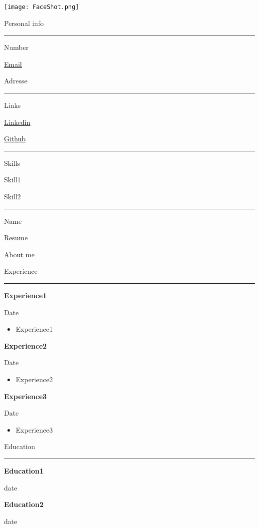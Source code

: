 \documentclass{letter}
\begin{document}
\begin{minipage}[t]{0.40\textwidth}
\setlength{\baselineskip}{1.5\baselineskip}
\color{white}
\vspace{1cm}

\texttt{[image: FaceShot.png]}

{\large Personal info}

\rule{\linewidth}{0.4pt}

\faPhone \quad Number


\faEnvelope \quad \href{somelink.com}{Email}


\faMapMarker \quad Adresse

\rule{\linewidth}{0.4pt}

{\large Links}

\faCode \quad \href{google.com}{Linkedin}

\faGithub \quad \href{github.com}{Github}

\rule{\linewidth}{0.4pt}

{\large Skills}

\faCircleNotch \quad Skill1

\faCircleNotch \quad Skill2


\rule{\linewidth}{0.4pt}


\end{minipage}
\hfill
\begin{minipage}[t]{0.60\textwidth}
\setlength{\baselineskip}{1.5\baselineskip}
\vspace{0.8cm}
{\huge Name}

{\large Resume}

\vspace{0.5cm}
 
About me

\vspace{0.5cm}

{\large Experience}
\rule{\linewidth}{0.4pt}

{\large \textbf{Experience1}}

{\small Date}

\begin{itemize}
    \item Experience1
\end{itemize}

{\large \textbf{Experience2}}

{\small Date}

\begin{itemize}
    \item Experience2
\end{itemize}


{\large \textbf{Experience3}}

{\small Date}

\begin{itemize}
    \item Experience3
\end{itemize}

{\large Education}
\rule{\linewidth}{0.4pt}

{\large \textbf{Education1}}

{\small date}

{\large \textbf{Education2}}

{\small date}


\end{minipage}
\end{document}
